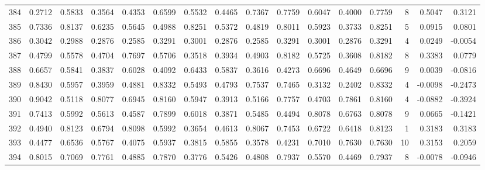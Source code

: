 \begin{tabular}{lrrrrrrrrrrrrrrr}
384 &      0.2712 &  0.5833 &  0.3564 &  0.4353 &  0.6599 &  0.5532 &  0.4465 &  0.7367 &  0.7759 &  0.6047 &   0.4000 &     0.7759 &      8 &                    0.5047 &                     0.3121 \\
385 &      0.7336 &  0.8137 &  0.6235 &  0.5645 &  0.4988 &  0.8251 &  0.5372 &  0.4819 &  0.8011 &  0.5923 &   0.3733 &     0.8251 &      5 &                    0.0915 &                     0.0801 \\
386 &      0.3042 &  0.2988 &  0.2876 &  0.2585 &  0.3291 &  0.3001 &  0.2876 &  0.2585 &  0.3291 &  0.3001 &   0.2876 &     0.3291 &      4 &                    0.0249 &                    -0.0054 \\
387 &      0.4799 &  0.5578 &  0.4704 &  0.7697 &  0.5706 &  0.3518 &  0.3934 &  0.4903 &  0.8182 &  0.5725 &   0.3608 &     0.8182 &      8 &                    0.3383 &                     0.0779 \\
388 &      0.6657 &  0.5841 &  0.3837 &  0.6028 &  0.4092 &  0.6433 &  0.5837 &  0.3616 &  0.4273 &  0.6696 &   0.4649 &     0.6696 &      9 &                    0.0039 &                    -0.0816 \\
389 &      0.8430 &  0.5957 &  0.3959 &  0.4881 &  0.8332 &  0.5493 &  0.4793 &  0.7537 &  0.7465 &  0.3132 &   0.2402 &     0.8332 &      4 &                   -0.0098 &                    -0.2473 \\
390 &      0.9042 &  0.5118 &  0.8077 &  0.6945 &  0.8160 &  0.5947 &  0.3913 &  0.5166 &  0.7757 &  0.4703 &   0.7861 &     0.8160 &      4 &                   -0.0882 &                    -0.3924 \\
391 &      0.7413 &  0.5992 &  0.5613 &  0.4587 &  0.7899 &  0.6018 &  0.3871 &  0.5485 &  0.4494 &  0.8078 &   0.6763 &     0.8078 &      9 &                    0.0665 &                    -0.1421 \\
392 &      0.4940 &  0.8123 &  0.6794 &  0.8098 &  0.5992 &  0.3654 &  0.4613 &  0.8067 &  0.7453 &  0.6722 &   0.6418 &     0.8123 &      1 &                    0.3183 &                     0.3183 \\
393 &      0.4477 &  0.6536 &  0.5767 &  0.4075 &  0.5937 &  0.3815 &  0.5855 &  0.3578 &  0.4231 &  0.7010 &   0.7630 &     0.7630 &     10 &                    0.3153 &                     0.2059 \\
394 &      0.8015 &  0.7069 &  0.7761 &  0.4885 &  0.7870 &  0.3776 &  0.5426 &  0.4808 &  0.7937 &  0.5570 &   0.4469 &     0.7937 &      8 &                   -0.0078 &                    -0.0946 \\

\end{tabular}
